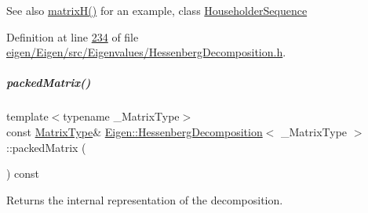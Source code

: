 \begin{DoxySeeAlso}{See also}
\hyperlink{group___eigenvalues___module_a8e781d2e22a2304647bcf0ae913cc8ea}{matrix\+H()} for an example, class \hyperlink{group___householder___module_class_eigen_1_1_householder_sequence}{Householder\+Sequence} 
\end{DoxySeeAlso}


Definition at line \hyperlink{eigen_2_eigen_2src_2_eigenvalues_2_hessenberg_decomposition_8h_source_l00234}{234} of file \hyperlink{eigen_2_eigen_2src_2_eigenvalues_2_hessenberg_decomposition_8h_source}{eigen/\+Eigen/src/\+Eigenvalues/\+Hessenberg\+Decomposition.\+h}.

\mbox{\label{group___eigenvalues___module_a1f72b7612fd4edc5a6f31005e433e1dd}} 
\subparagraph{\texorpdfstring{packed\+Matrix()}{packedMatrix()}\hspace{0.1cm}{\footnotesize\ttfamily [1/2]}}
{\footnotesize\ttfamily template$<$typename \+\_\+\+Matrix\+Type$>$ \\
const \hyperlink{group___eigenvalues___module_a93a611350a7db9d1da18f2c828ecea9f}{Matrix\+Type}\& \hyperlink{group___eigenvalues___module_class_eigen_1_1_hessenberg_decomposition}{Eigen\+::\+Hessenberg\+Decomposition}$<$ \+\_\+\+Matrix\+Type $>$\+::packed\+Matrix (\begin{DoxyParamCaption}{ }\end{DoxyParamCaption}) const\hspace{0.3cm}{\ttfamily [inline]}}



Returns the internal representation of the decomposition. 

